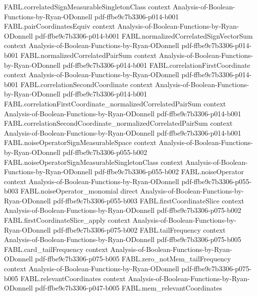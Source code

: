 \begin{theorem}
\proofstep
  {FABL.correlatedSignMeasurableSingletonClass}
  {context}
  {Analysis-of-Boolean-Functions-by-Ryan-ODonnell}
  {pdf-ffbe9c7b3306-p014-b001}
\proofstep
  {FABL.pairCoordinatesEquiv}
  {context}
  {Analysis-of-Boolean-Functions-by-Ryan-ODonnell}
  {pdf-ffbe9c7b3306-p014-b001}
\proofstep
  {FABL.normalizedCorrelatedSignVectorSum}
  {context}
  {Analysis-of-Boolean-Functions-by-Ryan-ODonnell}
  {pdf-ffbe9c7b3306-p014-b001}
\proofstep
  {FABL.normalizedCorrelatedPairSum}
  {context}
  {Analysis-of-Boolean-Functions-by-Ryan-ODonnell}
  {pdf-ffbe9c7b3306-p014-b001}
\proofstep
  {FABL.correlationFirstCoordinate}
  {context}
  {Analysis-of-Boolean-Functions-by-Ryan-ODonnell}
  {pdf-ffbe9c7b3306-p014-b001}
\proofstep
  {FABL.correlationSecondCoordinate}
  {context}
  {Analysis-of-Boolean-Functions-by-Ryan-ODonnell}
  {pdf-ffbe9c7b3306-p014-b001}
\proofstep
  {FABL.correlationFirstCoordinate_normalizedCorrelatedPairSum}
  {context}
  {Analysis-of-Boolean-Functions-by-Ryan-ODonnell}
  {pdf-ffbe9c7b3306-p014-b001}
\proofstep
  {FABL.correlationSecondCoordinate_normalizedCorrelatedPairSum}
  {context}
  {Analysis-of-Boolean-Functions-by-Ryan-ODonnell}
  {pdf-ffbe9c7b3306-p014-b001}
\proofstep
  {FABL.noiseOperatorSignMeasurableSpace}
  {context}
  {Analysis-of-Boolean-Functions-by-Ryan-ODonnell}
  {pdf-ffbe9c7b3306-p055-b002}
\proofstep
  {FABL.noiseOperatorSignMeasurableSingletonClass}
  {context}
  {Analysis-of-Boolean-Functions-by-Ryan-ODonnell}
  {pdf-ffbe9c7b3306-p055-b002}
\proofstep
  {FABL.noiseOperator}
  {context}
  {Analysis-of-Boolean-Functions-by-Ryan-ODonnell}
  {pdf-ffbe9c7b3306-p055-b003}
\proofstep
  {FABL.noiseOperator_monomial}
  {direct}
  {Analysis-of-Boolean-Functions-by-Ryan-ODonnell}
  {pdf-ffbe9c7b3306-p055-b003}
\proofstep
  {FABL.firstCoordinateSlice}
  {context}
  {Analysis-of-Boolean-Functions-by-Ryan-ODonnell}
  {pdf-ffbe9c7b3306-p075-b002}
\proofstep
  {FABL.firstCoordinateSlice_apply}
  {context}
  {Analysis-of-Boolean-Functions-by-Ryan-ODonnell}
  {pdf-ffbe9c7b3306-p075-b002}
\proofstep
  {FABL.tailFrequency}
  {context}
  {Analysis-of-Boolean-Functions-by-Ryan-ODonnell}
  {pdf-ffbe9c7b3306-p075-b005}
\proofstep
  {FABL.card_tailFrequency}
  {context}
  {Analysis-of-Boolean-Functions-by-Ryan-ODonnell}
  {pdf-ffbe9c7b3306-p075-b005}
\proofstep
  {FABL.zero_notMem_tailFrequency}
  {context}
  {Analysis-of-Boolean-Functions-by-Ryan-ODonnell}
  {pdf-ffbe9c7b3306-p075-b005}
\proofstep
  {FABL.relevantCoordinates}
  {context}
  {Analysis-of-Boolean-Functions-by-Ryan-ODonnell}
  {pdf-ffbe9c7b3306-p047-b005}
\proofstep
  {FABL.mem_relevantCoordinates}

\end{theorem}
